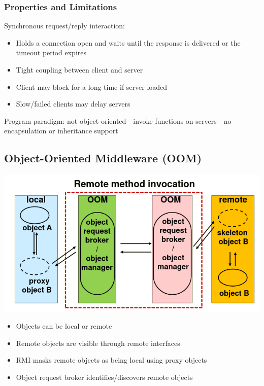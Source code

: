 \documentclass{article}[18pt]
\begin{document}
\subsubsection{Properties and Limitations}
Synchronous request/reply interaction:
\begin{itemize}
	\item Holds a connection open and waits until the response is delivered or the timeout period expires
	\item Tight coupling between client and server
	\item Client may block for a long time if server loaded
	\item Slow/failed clients may delay servers
\end{itemize}
Program paradigm: not object-oriented - invoke functions on servers - no encapsulation or inheritance support
\subsection{Object-Oriented Middleware (OOM)}
\begin{center}
	\includegraphics[scale=0.7]{OOM}
\end{center}
\begin{itemize}
	\item Objects can be local or remote
	\item Remote objects are visible through remote interfaces
	\item RMI masks remote objects as being local using proxy objects
	\item Object request broker identifies/discovers remote objects
\end{itemize}
\end{document}

